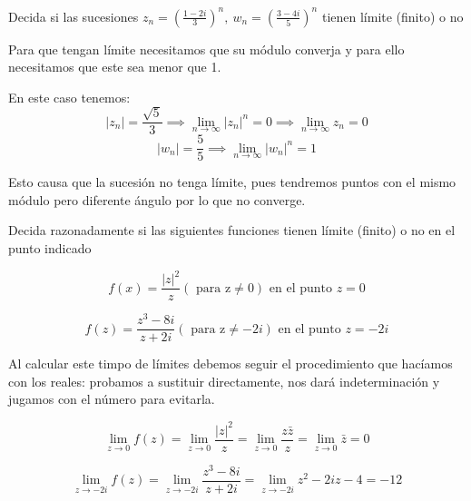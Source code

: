 \begin{problem}[3]
Decida si las sucesiones $z_n= \left(\frac{1-2i}{3}\right)^n, \ w_n = \left( \frac{3-4i}{5}\right)^n$ tienen límite (finito) o no

\solution
Para que tengan límite necesitamos que su módulo converja y para ello necesitamos que este sea menor que 1.

En este caso tenemos:
\[|z_n| = \frac{\sqrt{5}}{3} \implies \lim_{n \to \infty} |z_n|^n = 0 \implies \lim_{n\to\infty} z_n = 0\]
\newpage
\[|w_n| = \frac{5}{5} \implies \lim_{n \to \infty} |w_n|^n = 1\]

Esto causa que la sucesión no tenga límite, pues tendremos puntos con el mismo módulo pero diferente ángulo por lo que no converge.

\end{problem}

\begin{problem}[4]
Decida razonadamente si las siguientes funciones tienen límite (finito) o no en el punto indicado

\ppart
\[f(x) = \frac{|z|^2}{z} (\text{ para z}\neq0 )\text{ en el punto } z=0\]

\ppart
\[f(z)= \frac{z^3-8i}{z+2i} ( \text{ para z} \neq -2i) \text{ en el punto } z=-2i\]

\solution

Al calcular este timpo de límites debemos seguir el procedimiento que hacíamos con los reales: probamos a sustituir directamente, nos dará indeterminación y jugamos con el número para evitarla.

\spart
\[\lim_{z \to 0} f(z) = \lim_{z \to 0} \frac{|z|^2}{z} = \lim_{z \to 0}\frac{z \bar{z}}{z}=\lim_{z \to 0} \bar{z} = 0\]

\spart

\[\lim_{z \to -2i} f(z) = \lim_{z \to -2i} \frac{z^3-8i}{z+2i} = \lim_{z \to -2i} z^2-2iz-4 = -12\]
\end{problem}

